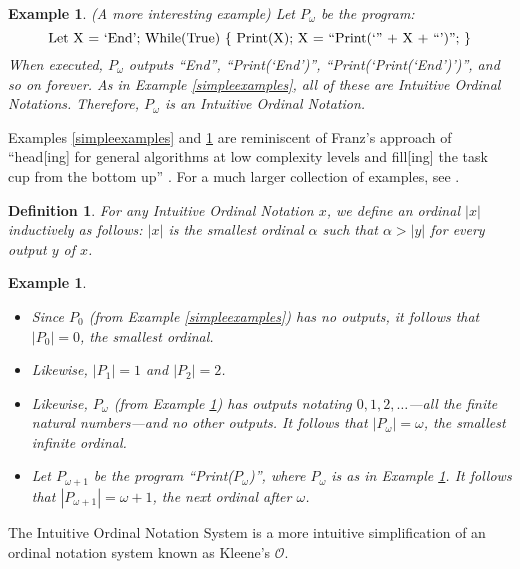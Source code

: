 \documentclass[runningheads]{llncs}
\newtheorem{myexample}[mytheorem]{Example}
\newtheorem{mydefinition}[mytheorem]{Definition}
\begin{document}
\begin{myexample}
\label{omegaexample}
(A more interesting example)
    Let $P_\omega$ be the program:
    \[
        \mbox{\normalfont Let X = `End';
        While(True) \{ Print(X); X = ``Print(`'' + X + ``')''; \}}
    \]
    When executed, $P_\omega$ outputs ``End'', ``Print(`End')'',
    ``Print(`Print(`End')')'', and so on forever. As
    in Example \ref{simpleexamples}, all of these are Intuitive Ordinal Notations.
    Therefore, $P_\omega$ is an Intuitive Ordinal Notation.
\end{myexample}

Examples \ref{simpleexamples} and \ref{omegaexample} are reminiscent
of Franz's approach of ``head[ing] for general algorithms at low complexity levels
and fill[ing] the task cup from the bottom up'' \cite{franz2015toward}.
For a much larger collection of examples, see \cite{github}.

\begin{mydefinition}
    For any Intuitive Ordinal Notation $x$, we define an ordinal $|x|$
    inductively as follows: $|x|$ is the smallest ordinal $\alpha$
    such that $\alpha>|y|$ for every output $y$ of $x$.
\end{mydefinition}

\begin{myexample}
    \begin{itemize}
        \item
        Since $P_0$ (from Example \ref{simpleexamples}) has no outputs,
        it follows that $|P_0|=0$, the smallest ordinal.
        \item
        Likewise, $|P_1|=1$ and $|P_2|=2$.
        \item
        Likewise, $P_\omega$ (from Example \ref{omegaexample}) has outputs
        notating $0, 1, 2, \ldots$---all the finite natural numbers---and no
        other outputs. It follows that $|P_\omega|=\omega$, the smallest
        infinite ordinal.
        \item
        Let $P_{\omega+1}$ be the program ``Print($P_\omega$)'',
        where $P_\omega$ is as in Example \ref{omegaexample}.
        It follows that $|P_{\omega+1}|=\omega+1$, the next ordinal after
        $\omega$.
    \end{itemize}
\end{myexample}

The Intuitive Ordinal Notation System is a more intuitive simplification of
an ordinal notation system known as Kleene's $\mathcal O$.
\end{document}

